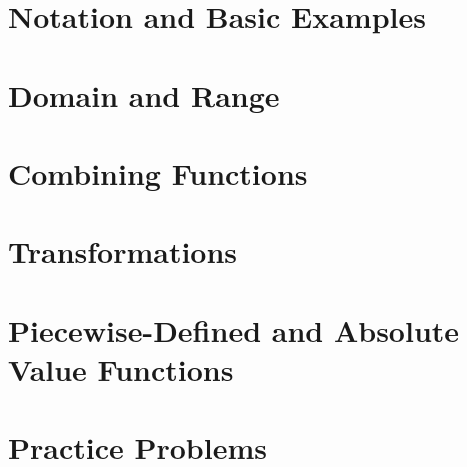 \section{Notation and Basic Examples}

\newpage


\newpage

\section{Domain and Range}

\newpage


\newpage


\newpage

\section{Combining Functions}

\newpage


\newpage

\section{Transformations}

\newpage


\newpage


\newpage


\newpage

\section{Piecewise-Defined and Absolute Value Functions}

\newpage


\newpage

\section{Practice Problems}

\newpage
\closegraphsfile